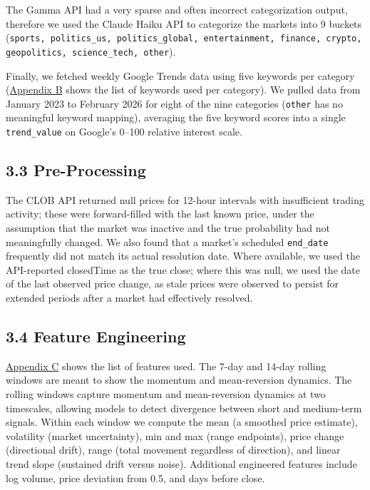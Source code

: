 \documentclass[11pt,twocolumn]{article}
\begin{document}
The Gamma API had a very sparse and often incorrect categorization output, therefore we used the Claude Haiku API to categorize the markets into 9 buckets (\texttt{sports, politics\_us, politics\_global, entertainment, finance, crypto, geopolitics, science\_tech, other}).

Finally, we fetched weekly Google Trends data using five keywords per category (\hyperref[sec:google-trends]{Appendix B} shows the list of keywords used per category). We pulled data from January 2023 to February 2026 for eight of the nine categories (\texttt{other} has no meaningful keyword mapping), averaging the five keyword scores into a single \texttt{trend\_value} on Google's 0--100 relative interest scale.

\subsection*{3.3 Pre-Processing}

The CLOB API returned null prices for 12-hour intervals with insufficient trading activity; these were forward-filled with the last known price, under the assumption that the market was inactive and the true probability had not meaningfully changed. We also found that a market's scheduled \texttt{end\_date} frequently did not match its actual resolution date. Where available, we used the API-reported closedTime as the true close; where this was null, we used the date of the last observed price change, as stale prices were observed to persist for extended periods after a market had effectively resolved.

\subsection*{3.4 Feature Engineering}

\hyperref[sec:appendix_features]{Appendix C} shows the list of features used. The 7-day and 14-day rolling windows are meant to show the momentum and mean-reversion dynamics. The rolling windows capture momentum and mean-reversion dynamics at two timescales, allowing models to detect divergence between short and medium-term signals. Within each window we compute the mean (a smoothed price estimate), volatility (market uncertainty), min and max (range endpoints), price change (directional drift), range (total movement regardless of direction), and linear trend slope (sustained drift versus noise). Additional engineered features include log volume, price deviation from 0.5, and days before close.
\end{document}
